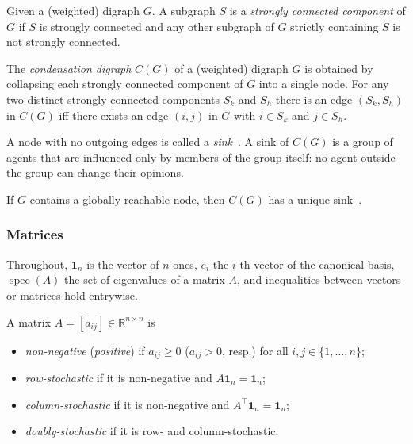 \begin{definition}
Given a (weighted) digraph $G$. A subgraph $S$ is a \emph{strongly connected
component} of $G$ if $S$ is strongly connected and any other subgraph of $G$ strictly
containing $S$ is not strongly connected.
\end{definition}

\begin{definition}
The \emph{condensation digraph} $C(G)$ of a (weighted) digraph $G$ is obtained by
collapsing each strongly connected component of $G$ into a single node. For any two
distinct strongly connected components $S_k$ and $S_h$ there is an edge $(S_k, S_h)$
in $C(G)$ iff there exists an edge $(i,j)$ in $G$ with $i \in S_k$ and $j \in S_h$.
\end{definition}

A node with no outgoing edges is called a \emph{sink}~\cite{baggio_graph}.
A sink of $C(G)$ is a group of agents that are influenced only by members of the group
itself: no agent outside the group can change their opinions.

If $G$ contains a globally reachable node, then $C(G)$ has a unique
sink~\cite{baggio_dt}.

\subsubsection{Matrices}
\label{subsubsec:prelim-matrices}

Throughout, $\mathbf{1}_n$ is the vector of $n$ ones, $e_i$ the $i$-th vector of the
canonical basis, $\operatorname{spec}(A)$ the set of eigenvalues of a matrix $A$, and
inequalities between vectors or matrices hold entrywise.

\begin{definition}
\label{def:row-stochastic}
A matrix $A = [a_{ij}] \in \mathbb{R}^{n \times n}$ is
\begin{itemize}
  \item[(i)] \emph{non-negative} (\emph{positive}) if $a_{ij} \geq 0$ ($a_{ij} > 0$,
             resp.) for all $i, j \in \{1, \dots, n\}$;
  \item[(ii)] \emph{row-stochastic} if it is non-negative and
              $A \mathbf{1}_n = \mathbf{1}_n$;
  \item[(iii)] \emph{column-stochastic} if it is non-negative and
               $A^\top \mathbf{1}_n = \mathbf{1}_n$;
  \item[(iv)] \emph{doubly-stochastic} if it is row- and column-stochastic.
\end{itemize}
\end{definition}

